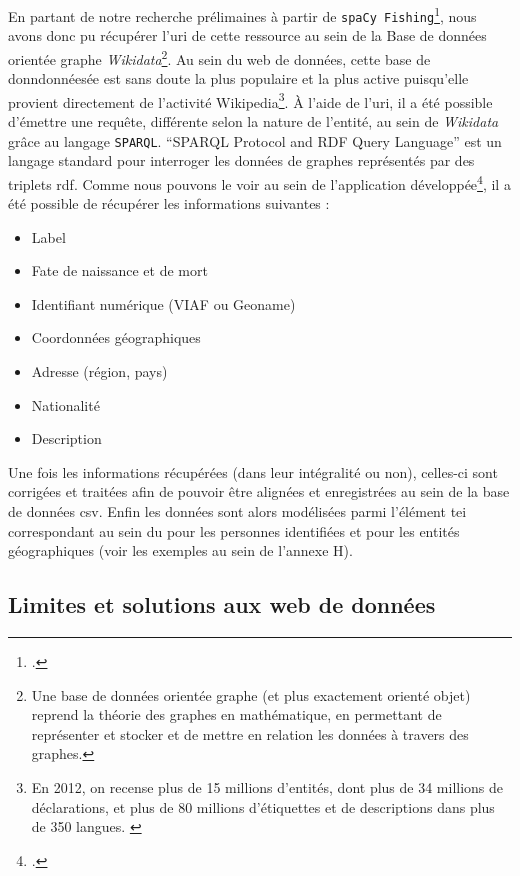 	En partant de notre recherche prélimaines à partir de \texttt{spaCy Fishing}\footcite{terrielSpaCyFishing2022}, nous avons donc pu récupérer l'\gls{uri} de cette ressource au sein de la Base de données orientée graphe \textit{Wikidata}\footnote{Une base de données orientée graphe (et plus exactement orienté objet) reprend la théorie des graphes en mathématique, en permettant de représenter et stocker et de mettre en relation les données à travers des graphes.}. Au sein du web de données, cette base de donndonnéesée est sans doute la plus populaire et la plus active puisqu'elle  provient directement de l'activité Wikipedia\footnote{En 2012, on recense plus de 15 millions d'entités, dont plus de 34 millions de déclarations, et plus de 80 millions d'étiquettes et de descriptions dans plus de 350 langues. \cite{erxlebenIntroducingWikidataLinked2014}}. 
	À l'aide de l'\gls{uri}, il a été possible d'émettre une requête, différente selon la nature de l'entité, au sein de \textit{Wikidata} grâce au langage \texttt{SPARQL}. “SPARQL Protocol and RDF Query Language” est un langage standard pour interroger les données de graphes représentés par des triplets \gls{rdf}. Comme nous pouvons le voir au sein de l'application développée\footcite[Voir le fichier TEI\_tranformation/src/enrichment/sparql.py .][]{humeauTeiTransformation2022}, il a été possible de récupérer les informations suivantes :
	\begin{itemize}
	    \item Label
	    \item Fate de naissance et de mort
	    \item Identifiant numérique (VIAF ou Geoname)
	    \item Coordonnées géographiques
	    \item Adresse (région, pays)
	    \item Nationalité
	    \item Description
	\end{itemize}
	
	Une fois les informations récupérées (dans leur intégralité ou non), celles-ci sont corrigées et traitées afin de pouvoir être alignées et enregistrées au sein de la base de données \gls{csv}. Enfin les données sont alors modélisées parmi l'élément \gls{tei} correspondant au sein du  pour les personnes identifiées et  pour les entités géographiques (voir les exemples au sein de l'annexe H).
	
	\subsection{Limites et solutions aux web de données}
	
